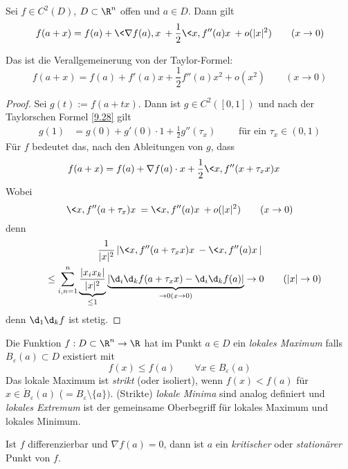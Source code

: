 \documentclass[a4paper,10pt]{scrartcl}
\begin{document}
\begin{thm}
Sei $f\in C^2(D)$, $D\subset \R^n$ offen und $a\in D$.
Dann gilt
\[
f(a+x)=f(a)+\<\nabla f(a), x\> + \frac 12 \<x,f''(a) x\> + o(|x|^2) \qquad (x\to 0)
\]
\begin{note}
Das ist die Verallgemeinerung von der Taylor-Formel:
\[
f(a+x) = f(a) + f'(a)x + \frac 12 f''(a)x^2 + o(x^2) \qquad (x\to 0)
\]
\end{note}

\begin{proof}
Sei $g(t):= f(a+tx)$. 
Dann ist $g \in C^2([0,1])$ und nach der Taylorschen Formel \ref{9.28} gilt
\begin{align*}
g(1) &= g(0) + g'(0)\cdot 1 + \frac 12 g''(\tau_x) \qquad \text{ für ein } \tau_x\in (0,1)
\end{align*}
Für $f$ bedeutet das, nach den Ableitungen von $g$, dass
\begin{align*}
f(a+x) &= f(a) + \nabla f(a)\cdot x + \frac 12 \<x,f''(x+\tau_x x)x\>
\end{align*}
Wobei
\[
	\<x,f''(a+\tau_x)x\> = \<x,f''(a)x\> + o(|x|^2) \qquad (x\to 0)
\]
denn
\begin{multline*}
\frac 1{|x|^2}\left|\<x,f''(a+\tau_x x)x\>-\<x,f''(a)x\>\right|\\
\quad \le \sum_{i,n=1}^n\underbrace{\frac {|x_ix_k|}{|x|^2}}_{\le 1}\underbrace{\left|\d_i\d_kf(a+\tau_x x)-\d_i\d_kf(a)\right|}_{\to 0 (x\to 0)} \to 0 \qquad (|x|\to 0)
\end{multline*}
denn $\d_1\d_kf$ ist stetig.
\end{proof}
\end{thm}

\begin{df}
Die Funktion $f:D\subset \R^n\to \R$ hat im Punkt $a\in D$ ein \emph{lokales Maximum} falls $B_\varepsilon(a)\subset D$ existiert mit
\[
f(x)\le f(a) \qquad \forall x\in B_\varepsilon(a)
\]
Das lokale Maximum ist \emph{strikt} (oder isoliert), wenn $f(x)<f(a)$ für $x\in \dot B_\varepsilon(a)$ ($=B_\varepsilon \setminus \{a\})$.
(Strikte) \emph{lokale Minima} sind analog definiert und \emph{lokales Extremum} ist der gemeinsame Oberbegriff für lokales Maximum und lokales Minimum.

Ist $f$ differenzierbar und $\nabla f(a)=0$, dann ist $a$ ein \emph{kritischer} oder \emph{stationärer} Punkt von $f$.
\end{df}
\end{document}
